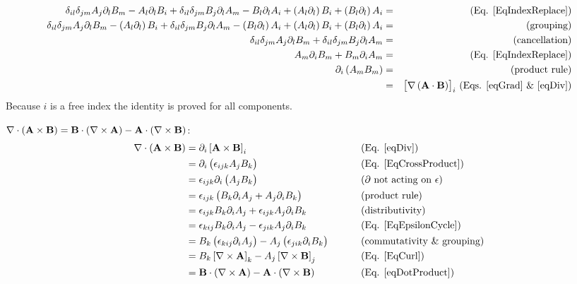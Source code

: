 {\begin{eqnarray}
\delta_{il}\delta_{jm}A_{j}\partial_{l}B_{m}-A_{l}\partial_{l}B_{i}+\delta_{il}
\delta_{jm}B_{j}\partial_{l}A_{m}-B_{l}\partial_{l}A_{i}+\left(A_{l}\partial_{l}
\right)B_{i}+\left(B_{l}\partial_{l}\right)A_{i} & = & \,\,\text{(Eq. 
\ref{EqIndexReplace})}\nonumber \\
\delta_{il}\delta_{jm}A_{j}\partial_{l}B_{m}-\left(A_{l}\partial_{l}\right)B_{i}
+\delta_{il}\delta_{jm}B_{j}\partial_{l}A_{m}-\left(B_{l}\partial_{l}\right)A_{i
}+\left(A_{l}\partial_{l}\right)B_{i}+\left(B_{l}\partial_{l}\right)A_{i} & = & 
\,\,\text{(grouping)}\nonumber \\
\delta_{il}\delta_{jm}A_{j}\partial_{l}B_{m}+\delta_{il}\delta_{jm}B_{j}
\partial_{l}A_{m} & = & \,\,\text{(cancellation)}\nonumber \\
A_{m}\partial_{i}B_{m}+B_{m}\partial_{i}A_{m} & = & \,\,\text{(Eq. 
\ref{EqIndexReplace})}\nonumber \\
\partial_{i}\left(A_{m}B_{m}\right) & = & \,\,\text{(product rule)}\nonumber \\
 & = & 
\left[\nabla\left(\mathbf{ A}\cdot\mathbf{ B}\right)\right]_{i}\,\text{(Eqs. 
\ref{eqGrad} \& \ref{eqDiv})}\nonumber
\end{eqnarray}
}Because $i$ is a free index the identity is proved for all components.

 
$\nabla\cdot\left(\mathbf{ A}\times\mathbf{ B}\right)=\mathbf{ B}
\cdot\left(\nabla\times\mathbf{ A}\right)-\mathbf{ A}
\cdot\left(\nabla\times\mathbf{ B}\right)$:
\begin{equation}
\begin{aligned}\nabla\cdot\left(\mathbf{ A}\times\mathbf{ B}\right) & 
=\partial_{i}\left[\mathbf{ A}\times\mathbf{ B}\right]_{i} & 
\,\,\,\,\,\,\,\,\,\,\,\,\,\, & \text{(Eq. \ref{eqDiv})}\\
 & =\partial_{i}\left(\epsilon_{ijk}A_{j}B_{k}\right) &  & \text{(Eq. 
\ref{EqCrossProduct})}\\
 & =\epsilon_{ijk}\partial_{i}\left(A_{j}B_{k}\right) &  & 
\text{(\ensuremath{\partial}\ not acting on \ensuremath{\epsilon})}\\
 & =\epsilon_{ijk}\left(B_{k}\partial_{i}A_{j}+A_{j}\partial_{i}B_{k}\right) &  
& \text{(product rule)}\\
 & =\epsilon_{ijk}B_{k}\partial_{i}A_{j}+\epsilon_{ijk}A_{j}\partial_{i}B_{k} &  
& \text{(distributivity)}\\
 & =\epsilon_{kij}B_{k}\partial_{i}A_{j}-\epsilon_{jik}A_{j}\partial_{i}B_{k} &  
& \text{(Eq. \ref{EqEpsilonCycle})}\\
 & 
=B_{k}\left(\epsilon_{kij}\partial_{i}A_{j}\right)-A_{j}\left(\epsilon_{jik}
\partial_{i}B_{k}\right) &  & \text{(commutativity \& grouping)}\\
 & 
=B_{k}\left[\nabla\times\mathbf{ A}\right]_{k}-A_{j}\left[\nabla\times\mathbf{ B}
\right]_{j} &  & \text{(Eq. \ref{EqCurl})}\\
 & 
=\mathbf{ B}\cdot\left(\nabla\times\mathbf{ A}\right)-\mathbf{ A}
\cdot\left(\nabla\times\mathbf{ B}\right) &  & \text{(Eq. \ref{eqDotProduct})}
\end{aligned}
\end{equation}


